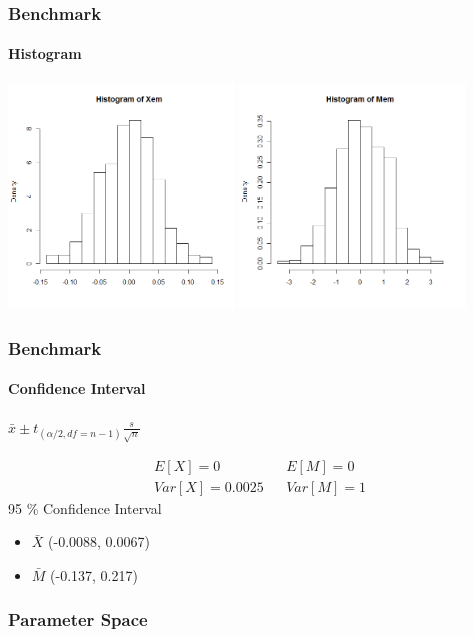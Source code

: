 \begin{frame}
    \frametitle{Benchmark}
	\framesubtitle{Histogram}
\includegraphics[height=6cm,width=6cm]{testhistX}
\includegraphics[height=6cm,width=6cm]{testhistM}
\end{frame}


\begin{frame}
    \frametitle{Benchmark}
	\framesubtitle{Confidence Interval}
\begin{center}
	$\bar{x} \pm t_{(\alpha /2, df=n-1)} \frac{s}{\sqrt{n}}$
\end{center}
\begin{eqnarray*}
	E[X] = 0 && E[M] = 0 \\
	Var[X] = 0.0025  && Var[M] = 1
\end{eqnarray*}
95 \% Confidence Interval
\begin{itemize}
	\item $\bar{X}$ (-0.0088, 0.0067)
	\item $\bar{M}$ (-0.137, 0.217)
\end{itemize}
\end{frame}


\begin{frame}
    \frametitle{Parameter Space}
\end{frame}



